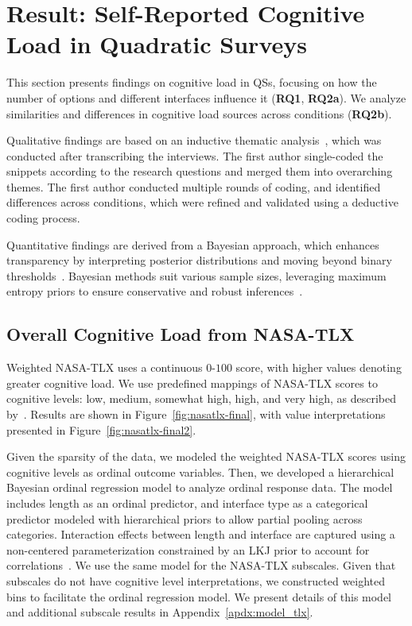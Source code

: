 \section{Result: Self-Reported Cognitive Load in Quadratic Surveys}
\label{sec:cog}
This section presents findings on cognitive load in QSs, focusing on how the number of options and different interfaces influence it (\textbf{RQ1}, \textbf{RQ2a}). We analyze similarities and differences in cognitive load sources across conditions (\textbf{RQ2b}).

Qualitative findings are based on an inductive thematic analysis~\cite{olsonWaysKnowingHCI2014}, which was conducted after transcribing the interviews. The first author single-coded the snippets according to the research questions and merged them into overarching themes. The first author conducted multiple rounds of coding, and identified differences across conditions, which were refined and validated using a deductive coding process.

Quantitative findings are derived from a Bayesian approach, which enhances transparency by interpreting posterior distributions and moving beyond binary thresholds~\cite{kay2016researcher}. Bayesian methods suit various sample sizes, leveraging maximum entropy priors to ensure conservative and robust inferences~\cite{mcelreath2018statistical}.

\subsection{Overall Cognitive Load from NASA-TLX}
\label{sec:cog_overall}
Weighted NASA-TLX uses a continuous $0$-$100$ score, with higher values denoting greater cognitive load. We use predefined mappings of NASA-TLX scores to cognitive levels: low, medium, somewhat high, high, and very high, as described by~\citet{hart1988development}. Results are shown in Figure~\ref{fig:nasatlx-final}, with value interpretations presented in Figure~\ref{fig:nasatlx-final2}.

Given the sparsity of the data, we modeled the weighted NASA-TLX scores using cognitive levels as ordinal outcome variables. Then, we developed a hierarchical Bayesian ordinal regression model to analyze ordinal response data. The model includes length as an ordinal predictor, and interface type as a categorical predictor modeled with hierarchical priors to allow partial pooling across categories. Interaction effects between length and interface are captured using a non-centered parameterization constrained by an LKJ prior to account for correlations~\cite{mcelreath2018statistical}. We use the same model for the NASA-TLX subscales. Given that subscales do not have cognitive level interpretations, we constructed weighted bins to facilitate the ordinal regression model. We present details of this model and additional subscale results in Appendix~\ref{apdx:model_tlx}.

